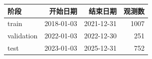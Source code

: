 \begin{center}
\small
\begin{tabular}{lrrr}
\toprule
阶段 & 开始日期 & 结束日期 & 观测数 \\
\midrule
train & 2018-01-03 & 2021-12-31 & 1007 \\
validation & 2022-01-03 & 2022-12-30 & 251 \\
test & 2023-01-03 & 2025-12-31 & 752 \\
\bottomrule
\end{tabular}
\end{center}